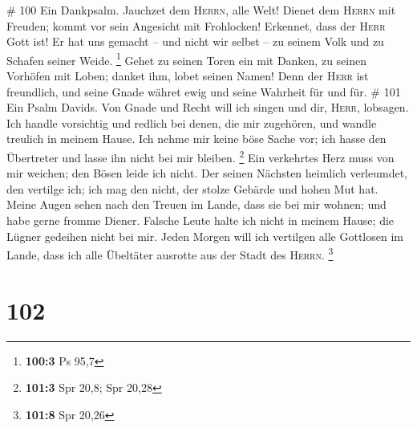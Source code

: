 \# 100  Ein Dankpsalm. Jauchzet dem \textsc{Herrn}, alle
Welt!  Dienet dem \textsc{Herrn} mit Freuden; kommt vor
sein Angesicht mit Frohlocken!  Erkennet, dass der
\textsc{Herr} Gott ist! Er hat uns gemacht -- und nicht wir selbst -- zu
seinem Volk und zu Schafen seiner Weide. \footnote{\textbf{100:3} Ps
  95,7}  Gehet zu seinen Toren ein mit Danken, zu seinen
Vorhöfen mit Loben; danket ihm, lobet seinen Namen!  Denn
der \textsc{Herr} ist freundlich, und seine Gnade währet ewig und seine
Wahrheit für und für. \# 101  Ein Psalm Davids. Von Gnade
und Recht will ich singen und dir, \textsc{Herr}, lobsagen.
 Ich handle vorsichtig und redlich bei denen, die mir
zugehören, und wandle treulich in meinem Hause.  Ich nehme
mir keine böse Sache vor; ich hasse den Übertreter und lasse ihn nicht
bei mir bleiben. \footnote{\textbf{101:3} Spr 20,8; Spr 20,28}
 Ein verkehrtes Herz muss von mir weichen; den Bösen leide
ich nicht.  Der seinen Nächsten heimlich verleumdet, den
vertilge ich; ich mag den nicht, der stolze Gebärde und hohen Mut hat.
 Meine Augen sehen nach den Treuen im Lande, dass sie bei
mir wohnen; und habe gerne fromme Diener.  Falsche Leute
halte ich nicht in meinem Hause; die Lügner gedeihen nicht bei mir.
 Jeden Morgen will ich vertilgen alle Gottlosen im Lande,
dass ich alle Übeltäter ausrotte aus der Stadt des \textsc{Herrn}.
\footnote{\textbf{101:8} Spr 20,26}

\hypertarget{section-32}{%
\section{102}\label{section-32}}

